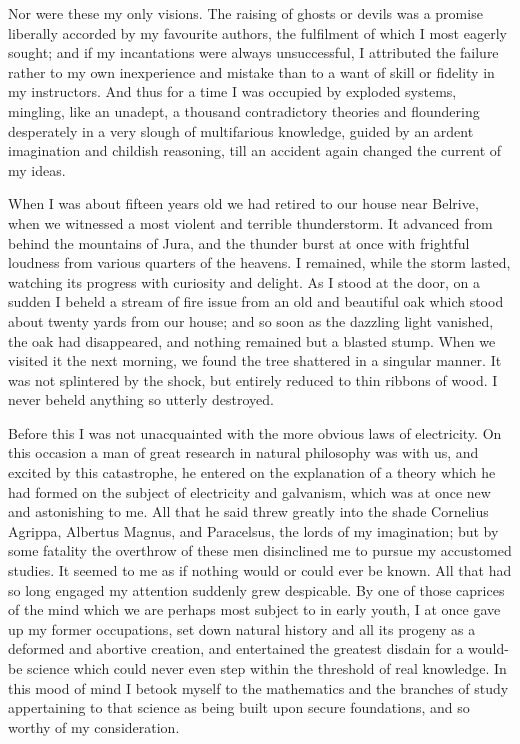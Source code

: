 \documentclass[12pt,openright]{book}
\begin{document}
Nor were these my only visions. The raising of ghosts or devils was a promise liberally accorded by my favourite authors, the fulfilment of which I most eagerly sought; and if my incantations were always unsuccessful, I attributed the failure rather to my own inexperience and mistake than to a want of skill or fidelity in my instructors. And thus for a time I was occupied by exploded systems, mingling, like an unadept, a thousand contradictory theories and floundering desperately in a very slough of multifarious knowledge, guided by an ardent imagination and childish reasoning, till an accident again changed the current of my ideas.

When I was about fifteen years old we had retired to our house near Belrive, when we witnessed a most violent and terrible thunderstorm. It advanced from behind the mountains of Jura, and the thunder burst at once with frightful loudness from various quarters of the heavens. I remained, while the storm lasted, watching its progress with curiosity and delight. As I stood at the door, on a sudden I beheld a stream of fire issue from an old and beautiful oak which stood about twenty yards from our house; and so soon as the dazzling light vanished, the oak had disappeared, and nothing remained but a blasted stump. When we visited it the next morning, we found the tree shattered in a singular manner. It was not splintered by the shock, but entirely reduced to thin ribbons of wood. I never beheld anything so utterly destroyed.

Before this I was not unacquainted with the more obvious laws of electricity. On this occasion a man of great research in natural philosophy was with us, and excited by this catastrophe, he entered on the explanation of a theory which he had formed on the subject of electricity and galvanism, which was at once new and astonishing to me. All that he said threw greatly into the shade Cornelius Agrippa, Albertus Magnus, and Paracelsus, the lords of my imagination; but by some fatality the overthrow of these men disinclined me to pursue my accustomed studies. It seemed to me as if nothing would or could ever be known. All that had so long engaged my attention suddenly grew despicable. By one of those caprices of the mind which we are perhaps most subject to in early youth, I at once gave up my former occupations, set down natural history and all its progeny as a deformed and abortive creation, and entertained the greatest disdain for a would-be science which could never even step within the threshold of real knowledge. In this mood of mind I betook myself to the mathematics and the branches of study appertaining to that science as being built upon secure foundations, and so worthy of my consideration.
\end{document}
